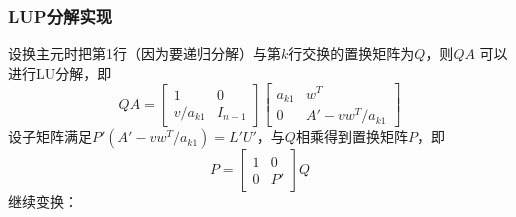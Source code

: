 \subsubsection{LUP分解实现}
设换主元时把第1行（因为要递归分解）与第$k$行交换的置换矩阵为$Q$，则$QA$
可以进行LU分解，即\begin{displaymath}
    QA=\left[\begin{array}{cc}
        1&0\\
        v/a_{k1}&I_{n-1}
    \end{array}\right]
    \left[\begin{array}{cc}
        a_{k1}&w^T\\
        0&A'-vw^T/a_{k1}
    \end{array}\right]
\end{displaymath}
设子矩阵满足$P'(A'-vw^T/a_{k1})=L'U'$，与$Q$相乘得到置换矩阵$P$，即
\begin{displaymath}
    P=\left[\begin{array}{cc}
        1&0\\
        0&P'
    \end{array}\right]Q
\end{displaymath}
继续变换：
